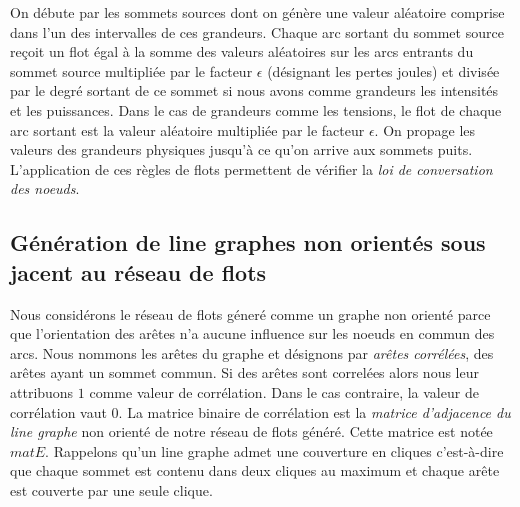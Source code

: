 \documentclass[onecolumn, 12pt]{book}
\begin{document}
On d\'ebute par les sommets sources dont on g\'en\`ere une valeur al\'eatoire comprise dans l'un des intervalles de ces grandeurs. 
Chaque arc sortant du sommet source re\c coit  un flot \'egal \`a la somme des valeurs al\'eatoires sur les arcs entrants du sommet source multipli\'ee par le facteur $\epsilon$ (d\'esignant les pertes joules) et divis\'ee par le degr\'e sortant de ce sommet si nous avons comme grandeurs les intensit\'es et les puissances.
Dans le cas de grandeurs comme les tensions, le flot de chaque arc sortant est la valeur al\'eatoire multipli\'ee par le facteur $\epsilon$. 
On propage les valeurs des grandeurs physiques jusqu'\`a ce qu'on arrive aux sommets puits.
L'application de ces r\`egles de flots permettent de v\'erifier la {\em loi de conversation des noeuds}.

\subsection{G\'en\'eration de line graphes non orient\'es sous jacent au r\'eseau de flots}
Nous consid\'erons le r\'eseau de flots g\'ener\'e comme un graphe non orient\'e parce que l'orientation des ar\^etes n'a aucune influence sur les noeuds en commun des arcs. \newline
Nous nommons les ar\^etes du graphe et d\'esignons par {\em ar\^etes corr\'el\'ees}, des ar\^etes ayant un sommet commun. Si des ar\^etes sont correl\'ees alors nous leur attribuons $1$ comme valeur de corr\'elation. Dans le cas contraire, la valeur de corr\'elation vaut $0$. \newline
La matrice binaire de corr\'elation est la {\em matrice d'adjacence du line graphe} non orient\'e de notre r\'eseau de flots g\'en\'er\'e. Cette matrice est not\'ee $matE$. \newline
Rappelons qu'un line graphe admet une couverture en cliques c'est-\`a-dire que chaque sommet est contenu dans deux cliques au maximum et chaque ar\^ete est couverte par une seule clique.
\end{document}
